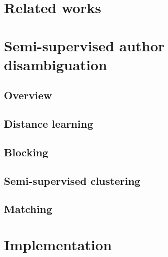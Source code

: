 \documentclass[11pt]{article}
\begin{document}

\section{Related works}
\label{relate-works}



\section{Semi-supervised author disambiguation}
\label{methods}

\subsection{Overview}

\subsection{Distance learning}

\subsection{Blocking}

\subsection{Semi-supervised clustering}

\subsection{Matching}



\section{Implementation}
\label{implementation}
\end{document}
